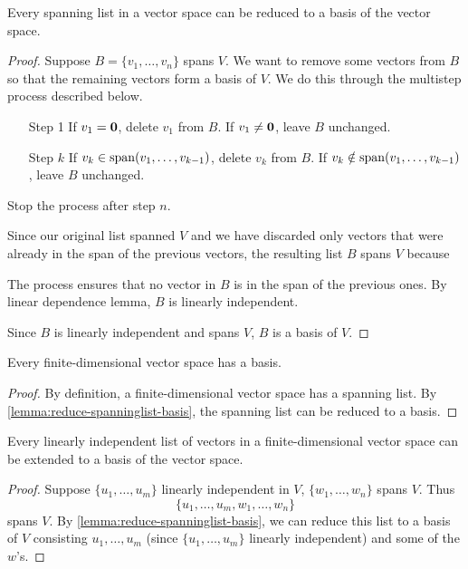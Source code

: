 \begin{lemma}\label{lemma:reduce-spanninglist-basis}
Every spanning list in a vector space can be reduced to a basis of the vector space.
\end{lemma}

\begin{proof}
Suppose $B=\{v_1,\dots,v_n\}$ spans $V$. We want to remove some vectors from $B$ so that the remaining vectors form a basis of $V$. We do this through the multistep process described below.

\begin{enumerate}
\item[Step 1] If $v_1=\vb{0}$, delete $v_1$ from $B$. If $v_1\neq\vb{0}$, leave $B$ unchanged.
\item[Step $k$] If $v_k\in\operatorname{span}(v_1,\dots,v_{k-1})$, delete $v_k$ from $B$. If $v_k\notin\operatorname{span}(v_1,\dots,v_{k-1})$, leave $B$ unchanged.
\end{enumerate}

Stop the process after step $n$.

Since our original list spanned $V$ and we have discarded only vectors that were already in the span of the previous vectors, the resulting list $B$ spans $V$ because

The process ensures that no vector in $B$ is in the span of the previous ones. By linear dependence lemma, $B$ is linearly independent.

Since $B$ is linearly independent and spans $V$, $B$ is a basis of $V$.
\end{proof}

\begin{proposition}
Every finite-dimensional vector space has a basis.
\end{proposition}

\begin{proof}
By definition, a finite-dimensional vector space has a spanning list. By \cref{lemma:reduce-spanninglist-basis}, the spanning list can be reduced to a basis.
\end{proof}

\begin{lemma}\label{lemma:extend-linind-basis}
Every linearly independent list of vectors in a finite-dimensional vector space can be extended to a basis of the vector space.
\end{lemma}

\begin{proof}
Suppose $\{u_1,\dots,u_m\}$ linearly independent in $V$, $\{w_1,\dots,w_n\}$ spans $V$. Thus
\[\{u_1,\dots,u_m,w_1,\dots,w_n\}\]
spans $V$. By \cref{lemma:reduce-spanninglist-basis}, we can reduce this list to a basis of $V$ consisting $u_1,\dots,u_m$ (since $\{u_1,\dots,u_m\}$ linearly independent) and some of the $w$'s.
\end{proof}

